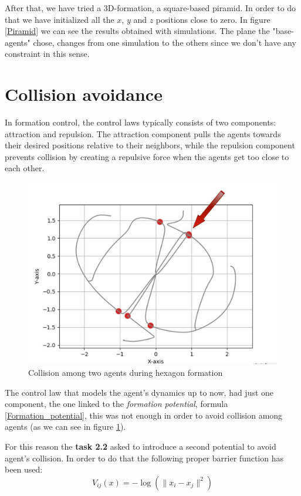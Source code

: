 \documentclass[a4paper,11pt,oneside]{book}
\begin{document}
After that, we have tried a 3D-formation, a square-based piramid. In order to do that we have initialized all the $x$, $y$ and $z$ positions close to zero. In figure \ref{Piramid} we can see the results obtained with simulations. The plane the "base-agents" chose, changes from one simulation to the others since we don't have any constraint in this sense.


\section{Collision avoidance}
In formation control, the control laws typically consists of two components: attraction and repulsion. The attraction component pulls the agents towards their desired positions relative to their neighbors, while the repulsion component prevents collision by creating a repulsive force when the agents get too close to each other.

\begin{figure}[h]
\centering
	\includegraphics[scale=0.25]{Collision}
	\caption{Collision among two agents during hexagon formation}
	\label{Collision}
\end{figure}

The control law that models the agent's dynamics up to now, had just one component, the one linked to the \textit{formation potential}, formula \ref{Formation_potential}, this was not enough in order to avoid collision among agents (as we can see in figure \ref{Collision}). 

\bigskip
For this reason the \textbf{task 2.2} asked to introduce a second potential to avoid agent's collision. In order to do that the following proper barrier function has been used:
\begin{equation}
V_{ij}(x) = - \log( \lVert x_i - x_j \rVert ^2)
\label{Collision_barrier}
\end{equation}
\end{document}
